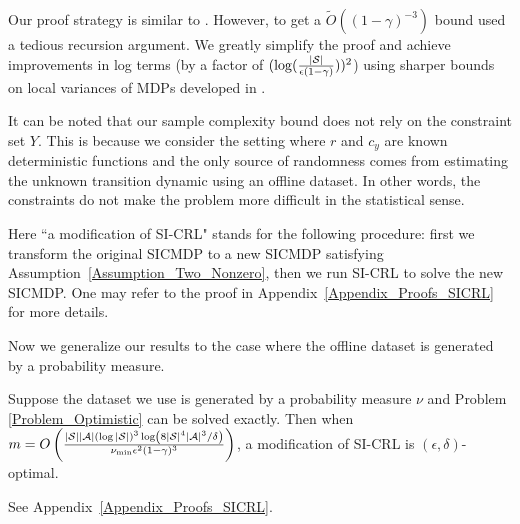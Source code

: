 Our proof strategy is similar to \cite{LATTIMORE2014125}. 
However, to get a $\widetilde O((1-\gamma)^{-3})$ bound \cite{LATTIMORE2014125} used a tedious recursion argument.
We greatly simplify the proof and achieve improvements in log terms (by a factor of $(\log(\frac{|{\mathcal{S}}|}{\epsilon(1-\gamma)}))^2$) using sharper bounds on local variances of MDPs developed in \cite{pmlr-v125-agarwal20b}.


\begin{remark}\label{Remark_Sample_Complexity_General_Dependence_on_Constraints}
It can be noted that our sample complexity bound does not rely on the constraint set $Y$.
This is because we consider the setting where $r$ and $c_y$ are known deterministic functions and the only source of randomness comes from estimating the unknown transition dynamic using an offline dataset.
In other words, the constraints do not make the problem more difficult in the statistical sense.
\end{remark}

\begin{remark}\label{Remark_Modification}
Here ``a modification of SI-CRL" stands for the following procedure: first we transform the original SICMDP to a new SICMDP satisfying Assumption~\ref{Assumption_Two_Nonzero}, then we run SI-CRL to solve the new SICMDP.
One may refer to the proof in Appendix~\ref{Appendix_Proofs_SICRL} for more details.
\end{remark}

Now we generalize our results to the case where the offline dataset is generated by a probability measure.
\begin{theorem}\label{Theorem_Sample_Complexity_General_Measure}
Suppose the dataset we use is generated by a probability measure $\nu$ and Problem \ref{Problem_Optimistic} can be solved exactly. Then when $m=O\left(\frac{|{\mathcal{S}}||{\mathcal{A}}|\left({\log|{\mathcal{S}}|}\right)^3\log \left({8|{\mathcal{S}}|^4|{\mathcal{A}}|^3/\delta}\right)}{\nu_{\min} \epsilon^2(1-\gamma)^3}\right)$, a modification of SI-CRL is $(\epsilon,\delta)$-optimal.
\end{theorem}
See Appendix~\ref{Appendix_Proofs_SICRL}.